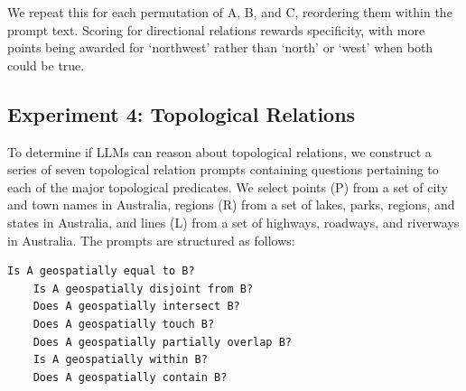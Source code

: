 \noindent We repeat this for each permutation of A, B, and C, reordering them within the prompt text.
Scoring for directional relations rewards specificity, with more points being awarded for `northwest' rather than `north' or `west' when both could be true. 



\subsection{Experiment 4: Topological Relations}
To determine if LLMs can reason about topological relations, we construct a series of seven topological relation prompts containing questions pertaining to each of the major topological predicates.
We select points (P) from a set of city and town names in Australia, regions (R) from a set of lakes, parks, regions, and states in Australia, and lines (L) from a set of highways, roadways, and riverways in Australia.
The prompts are structured as follows:

\begin{lstlisting}[title=Prompts 8-14: Topological Relation Prompts]
    Is A geospatially equal to B?
    Is A geospatially disjoint from B?
    Does A geospatially intersect B?
    Does A geospatially touch B?
    Does A geospatially partially overlap B?
    Is A geospatially within B?
    Does A geospatially contain B?
\end{lstlisting}

